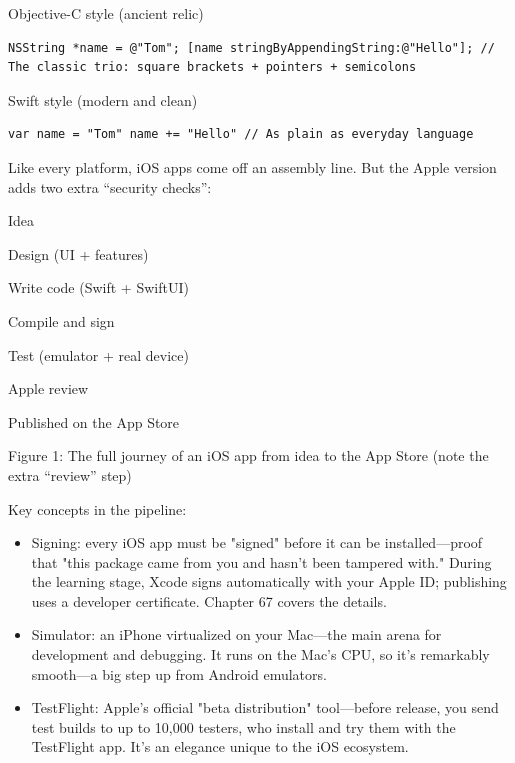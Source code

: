 Objective-C style (ancient relic)

\begin{lstlisting}
NSString *name = @"Tom"; [name stringByAppendingString:@"Hello"]; // The classic trio: square brackets + pointers + semicolons
\end{lstlisting}

Swift style (modern and clean)

\begin{lstlisting}
var name = "Tom" name += "Hello" // As plain as everyday language
\end{lstlisting}


Like every platform, iOS apps come off an assembly line. But the Apple version adds two extra “security checks”:

Idea

Design (UI + features)

Write code (Swift + SwiftUI)

Compile and sign

Test (emulator + real device)

Apple review

Published on the App Store

\begin{center}\small\color{gray}Figure 1: The full journey of an iOS app from idea to the App Store (note the extra “review” step)\end{center}

Key concepts in the pipeline:

\begin{itemize}
  \item Signing: every iOS app must be "signed" before it can be installed—proof that "this package came from you and hasn't been tampered with." During the learning stage, Xcode signs automatically with your Apple ID; publishing uses a developer certificate. Chapter 67 covers the details.
  \item Simulator: an iPhone virtualized on your Mac—the main arena for development and debugging. It runs on the Mac's CPU, so it's remarkably smooth—a big step up from Android emulators.
  \item TestFlight: Apple's official "beta distribution" tool—before release, you send test builds to up to 10,000 testers, who install and try them with the TestFlight app. It's an elegance unique to the iOS ecosystem.
\end{itemize}

